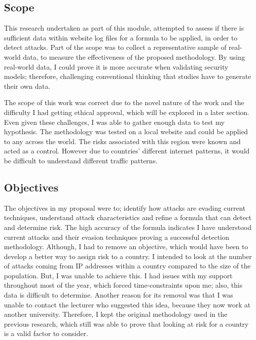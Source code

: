 \subsection{Scope}

This research undertaken as part of this module, attempted to assess if there is sufficient data within website log files for a formula to be applied, in order to detect attacks. Part of the scope was to collect a representative sample of real-world data, to measure the effectiveness of the proposed methodology. By using real-world data, I could prove it is more accurate when validating security models; therefore, challenging conventional thinking that studies have to generate their own data.

The scope of this work was correct due to the novel nature of the work and the difficulty I had getting ethical approval, which will be explored in a later section. Even given these challenges, I was able to gather enough data to test my hypothesis. The methodology was tested on a local website and could be applied to any across the world. The risks associated with this region were known and acted as a control. However due to countries' different internet patterns, it would be difficult to understand different traffic patterns. 


\subsection{Objectives}

The objectives in my proposal were to; identify how attacks are evading current techniques, understand attack characteristics and refine a formula that can detect and determine risk. The high accuracy of the formula indicates I have understood current attacks and their evasion techniques proving a successful detection methodology. Although, I had to remove an objective, which would have been to develop a better way to assign risk to a country. I intended to look at the number of attacks coming from IP addresses within a country compared to the size of the population. But, I was unable to achieve this. I had issues with my support throughout most of the year, which forced time-constraints upon me; also, this data is difficult to determine. Another reason for its removal was that I was unable to contact the lecturer who suggested this idea, because they now work at another university. Therefore, I kept the original methodology used in the previous research, which still was able to prove that looking at risk for a country is a valid factor to consider.

